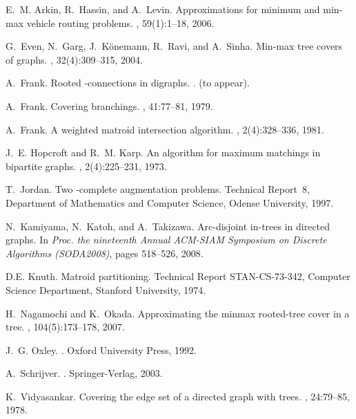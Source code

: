 \documentclass[11pt]{article}
\newcounter{ni}
\newcounter{san}
\theoremstyle{plain}
\begin{document}
\begin{thebibliography}{14}

E.~M. Arkin, R.~Hassin, and A.~Levin.
\newblock Approximations for minimum and min-max vehicle routing problems.
, 59(1):1--18, 2006.

G.~Even, N.~Garg, J.~K{\"o}nemann, R.~Ravi, and A.~Sinha.
\newblock Min-max tree covers of graphs.
, 32(4):309--315, 2004.

A.~Frank.
\newblock Rooted {}-connections in digraphs.
.
\newblock (to appear).

A.~Frank.
\newblock Covering branchings.
, 41:77--81, 1979.

A.~Frank.
\newblock A weighted matroid intersection algorithm.
, 2(4):328--336, 1981.

J.~E. Hopcroft and R.~M. Karp.
\newblock An {} algorithm for maximum matchings in bipartite graphs.
, 2(4):225--231, 1973.

T.~Jordan.
\newblock Two {}-complete augmentation problems.
\newblock Technical Report~8, {D}epartment of {M}athematics and {C}omputer
  {S}cience, {O}dense {U}niversity, 1997.

N.~Kamiyama, N.~Katoh, and A.~Takizawa.
\newblock Arc-disjoint in-trees in directed graphs.
\newblock In {\em Proc. the nineteenth Annual ACM-SIAM Symposium on Discrete
  Algorithms (SODA2008)}, pages 518--526, 2008.

D.E. Knuth.
\newblock Matroid partitioning.
\newblock Technical Report {STAN-CS}-73-342, {C}omputer {S}cience {D}epartment,
  {S}tanford {U}niversity, 1974.

H.~Nagamochi and K.~Okada.
\newblock Approximating the minmax rooted-tree cover in a tree.
, 104(5):173--178, 2007.

J.~G. Oxley.
.
\newblock Oxford University Press, 1992.

A.~Schrijver.
.
\newblock Springer-Verlag, 2003.

K.~Vidyasankar.
\newblock Covering the edge set of a directed graph with trees.
, 24:79--85, 1978.

\end{thebibliography}
\end{document}

